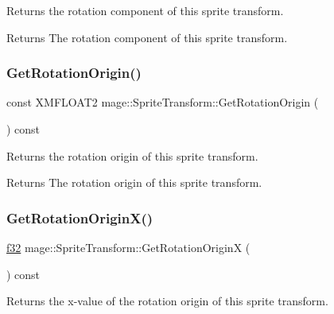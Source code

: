 Returns the rotation component of this sprite transform.

\begin{DoxyReturn}{Returns}
The rotation component of this sprite transform. 
\end{DoxyReturn}
\hypertarget{structmage_1_1_sprite_transform_aa7a6f3cad38ed9231455de722e60040c}{}\label{structmage_1_1_sprite_transform_aa7a6f3cad38ed9231455de722e60040c} 
\subsubsection{\texorpdfstring{Get\+Rotation\+Origin()}{GetRotationOrigin()}}
{\footnotesize\ttfamily const X\+M\+F\+L\+O\+A\+T2 mage\+::\+Sprite\+Transform\+::\+Get\+Rotation\+Origin (\begin{DoxyParamCaption}{ }\end{DoxyParamCaption}) const\hspace{0.3cm}{\ttfamily [noexcept]}}

Returns the rotation origin of this sprite transform.

\begin{DoxyReturn}{Returns}
The rotation origin of this sprite transform. 
\end{DoxyReturn}
\hypertarget{structmage_1_1_sprite_transform_a52b7e1b0d4adb2322068676acfc36547}{}\label{structmage_1_1_sprite_transform_a52b7e1b0d4adb2322068676acfc36547} 
\subsubsection{\texorpdfstring{Get\+Rotation\+Origin\+X()}{GetRotationOriginX()}}
{\footnotesize\ttfamily \hyperlink{namespacemage_a6a44ad388483959dc4dff9f2aef91431}{f32} mage\+::\+Sprite\+Transform\+::\+Get\+Rotation\+OriginX (\begin{DoxyParamCaption}{ }\end{DoxyParamCaption}) const\hspace{0.3cm}{\ttfamily [noexcept]}}

Returns the x-\/value of the rotation origin of this sprite transform.

